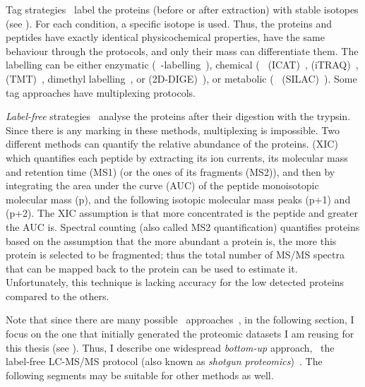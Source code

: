 Tag strategies~ label the proteins (before or after extraction)
with stable isotopes (see ).
For each condition, a specific isotope is used.
Thus, the proteins and peptides
have exactly identical physicochemical properties,
have the same behaviour through the protocols, and
only their mass can differentiate them.
The labelling can be either
enzymatic (\eg\ -labelling~),
chemical (\eg\  (\gls{ICAT})~,
 (\gls{iTRAQ})~,
 (\gls{TMT})~,
dimethyl labelling~,
or  (\gls{2D-DIGE})~),
or metabolic (\eg\  (\gls{SILAC})~).
Some tag approaches have multiplexing protocols.

\emph{Label-free} strategies~
analyse the proteins after their digestion with the trypsin.
Since there is any marking in these methods, multiplexing is impossible.
Two different methods can quantify the relative abundance of the proteins.
 (\gls{XIC})~
which quantifies each peptide by extracting its ion currents,
its molecular mass and retention time (MS1) (or the ones of its fragments (MS2)),
and then by integrating the area under the curve (\gls{AUC}) of the peptide
monoisotopic molecular mass (p),
and the following isotopic molecular mass peaks (p+1) and (p+2).
The \gls{XIC} assumption is that more concentrated is the peptide and
greater the \gls{AUC} is.
Spectral counting (also called MS2 quantification)
quantifies proteins based on the assumption that
the more abundant a protein is, the more this protein is selected to be fragmented;
thus the total number of \gls{MS/MS} spectra that can be mapped back to
the protein can be used to estimate it.
Unfortunately, this technique is lacking accuracy for the low detected proteins
compared to the others.

Note that since there are many possible \ms\ approaches~,
in the following section, I focus on the one
that initially generated the proteomic datasets
I am reusing for this thesis (see ).
Thus, I describe one widespread \emph{bottom-up} approach,
\ie\ the label-free \gls{LC-MS/MS} protocol
(also known as \emph{shotgun proteomics})~.
The following segments may be suitable for other methods as well.

